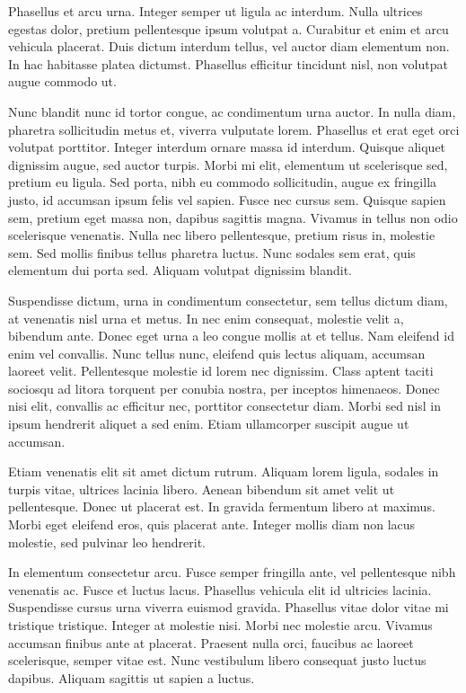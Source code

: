 \documentclass[a4paper,10pt,twoside]{article} %
\begin{document}
Phasellus et arcu urna.
Integer semper ut ligula ac interdum.
Nulla ultrices egestas dolor, pretium pellentesque ipsum volutpat a.
Curabitur et enim et arcu vehicula placerat.
Duis dictum interdum tellus, vel auctor diam elementum non.
In hac habitasse platea dictumst.
Phasellus efficitur tincidunt nisl, non volutpat augue commodo ut.

Nunc blandit nunc id tortor congue, ac condimentum urna auctor.
In nulla diam, pharetra sollicitudin metus et, viverra vulputate lorem.
Phasellus et erat eget orci volutpat porttitor.
Integer interdum ornare massa id interdum.
Quisque aliquet dignissim augue, sed auctor turpis.
Morbi mi elit, elementum ut scelerisque sed, pretium eu ligula.
Sed porta, nibh eu commodo sollicitudin, augue ex fringilla justo, id accumsan ipsum felis vel sapien.
Fusce nec cursus sem.
Quisque sapien sem, pretium eget massa non, dapibus sagittis magna.
Vivamus in tellus non odio scelerisque venenatis.
Nulla nec libero pellentesque, pretium risus in, molestie sem.
Sed mollis finibus tellus pharetra luctus.
Nunc sodales sem erat, quis elementum dui porta sed.
Aliquam volutpat dignissim blandit.

Suspendisse dictum, urna in condimentum consectetur, sem tellus dictum diam, at venenatis nisl urna et metus.
In nec enim consequat, molestie velit a, bibendum ante.
Donec eget urna a leo congue mollis at et tellus.
Nam eleifend id enim vel convallis.
Nunc tellus nunc, eleifend quis lectus aliquam, accumsan laoreet velit.
Pellentesque molestie id lorem nec dignissim.
Class aptent taciti sociosqu ad litora torquent per conubia nostra, per inceptos himenaeos.
Donec nisi elit, convallis ac efficitur nec, porttitor consectetur diam.
Morbi sed nisl in ipsum hendrerit aliquet a sed enim.
Etiam ullamcorper suscipit augue ut accumsan.

Etiam venenatis elit sit amet dictum rutrum.
Aliquam lorem ligula, sodales in turpis vitae, ultrices lacinia libero.
Aenean bibendum sit amet velit ut pellentesque.
Donec ut placerat est.
In gravida fermentum libero at maximus.
Morbi eget eleifend eros, quis placerat ante.
Integer mollis diam non lacus molestie, sed pulvinar leo hendrerit.

In elementum consectetur arcu.
Fusce semper fringilla ante, vel pellentesque nibh venenatis ac.
Fusce et luctus lacus.
Phasellus vehicula elit id ultricies lacinia.
Suspendisse cursus urna viverra euismod gravida.
Phasellus vitae dolor vitae mi tristique tristique.
Integer at molestie nisi.
Morbi nec molestie arcu.
Vivamus accumsan finibus ante at placerat.
Praesent nulla orci, faucibus ac laoreet scelerisque, semper vitae est.
Nunc vestibulum libero consequat justo luctus dapibus.
Aliquam sagittis ut sapien a luctus.
\end{document}
